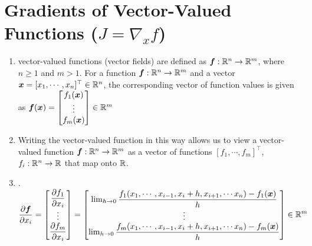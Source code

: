 \section{Gradients of Vector-Valued Functions ($J = \nabla_x f$)}

\begin{enumerate}
    \item 
    \begin{definition}
        vector-valued functions (vector fields) are defined as $\bm{f} : \mathbb{R}^n \to \mathbb{R}^m$, where $n \geq 1$ and $m > 1$.
        For a function $\bm{f} : \mathbb{R}^n \to \mathbb{R}^m$ and a vector $\bm{x} = [x_1, \cdots , x_n]^\top \in \mathbb{R}^n$, the corresponding vector of function values is given as
        $
            \bm{f}(\bm{x})
            = \begin{bmatrix}
                f_1(\bm{x}) \\
                \vdots \\
                f_m(\bm{x})
            \end{bmatrix}
            \in \mathbb{R}^m
        $
        \hfill \cite{mfml/book/mml/Deisenroth-Faisal-Ong}
    \end{definition}

    \item Writing the vector-valued function in this way allows us to view a vector-valued function $\bm{f} : \mathbb{R}^n \to \mathbb{R}^m$ as a vector of functions $[f_1, \cdots , f_m]^\top$, $f_i : \mathbb{R}^n \to \mathbb{R}$ that map onto $\mathbb{R}$. 
    \hfill \cite{mfml/book/mml/Deisenroth-Faisal-Ong}

    \item 
    .\hfill
    ${
        \displaystyle
        \dfrac{\partial\bm{f}}{\partial x_i}
        = \begin{bmatrix}
            \dfrac{\partial f_1}{\partial x_i} \\
            \vdots \\
            \dfrac{\partial f_m}{\partial x_i}
        \end{bmatrix}
        = \begin{bmatrix}
            \lim_{h \to 0} \dfrac{f_1(x_1,\cdots,x_{i-1},x_i+h,x_{i+1},\cdots x_n)-f_1(\bm{x})}{h} \\
            \vdots \\
            \lim_{h \to 0} \dfrac{f_m(x_1,\cdots,x_{i-1},x_i+h,x_{i+1},\cdots x_n)-f_m(\bm{x})}{h}
        \end{bmatrix}
        \in \mathbb{R}^m
    }$
    \hfill \cite{mfml/book/mml/Deisenroth-Faisal-Ong}


\end{enumerate}
